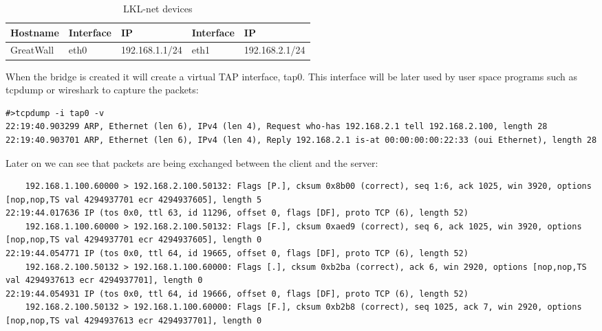 
\begin{center}
  \begin{table}[htb]
  \begin{center}
  \begin{tabular}{| l | l | l | l | l |}
    \hline
      Hostname & Interface & IP & Interface & IP \\ \hline
      GreatWall & eth0 & 192.168.1.1/24 & eth1 & 192.168.2.1/24 \\ 
    \hline
  \end{tabular}
  \end{center}
  \caption{LKL-net devices}
  \label{table:tdevices}
  \end{table}
\end{center}

When the bridge is created it will create a virtual TAP interface,  tap0. This interface will be later used
by user space programs such as tcpdump or wireshark to capture the packets:

\begin{lstlisting}
#>tcpdump -i tap0 -v
22:19:40.903299 ARP, Ethernet (len 6), IPv4 (len 4), Request who-has 192.168.2.1 tell 192.168.2.100, length 28
22:19:40.903701 ARP, Ethernet (len 6), IPv4 (len 4), Reply 192.168.2.1 is-at 00:00:00:00:22:33 (oui Ethernet), length 28
\end{lstlisting}

Later on we can see that packets are being exchanged between the client and the server:

\begin{lstlisting}
    192.168.1.100.60000 > 192.168.2.100.50132: Flags [P.], cksum 0x8b00 (correct), seq 1:6, ack 1025, win 3920, options [nop,nop,TS val 4294937701 ecr 4294937605], length 5
22:19:44.017636 IP (tos 0x0, ttl 63, id 11296, offset 0, flags [DF], proto TCP (6), length 52)
    192.168.1.100.60000 > 192.168.2.100.50132: Flags [F.], cksum 0xaed9 (correct), seq 6, ack 1025, win 3920, options [nop,nop,TS val 4294937701 ecr 4294937605], length 0
22:19:44.054771 IP (tos 0x0, ttl 64, id 19665, offset 0, flags [DF], proto TCP (6), length 52)
    192.168.2.100.50132 > 192.168.1.100.60000: Flags [.], cksum 0xb2ba (correct), ack 6, win 2920, options [nop,nop,TS val 4294937613 ecr 4294937701], length 0
22:19:44.054931 IP (tos 0x0, ttl 64, id 19666, offset 0, flags [DF], proto TCP (6), length 52)
    192.168.2.100.50132 > 192.168.1.100.60000: Flags [F.], cksum 0xb2b8 (correct), seq 1025, ack 7, win 2920, options [nop,nop,TS val 4294937613 ecr 4294937701], length 0
\end{lstlisting}

